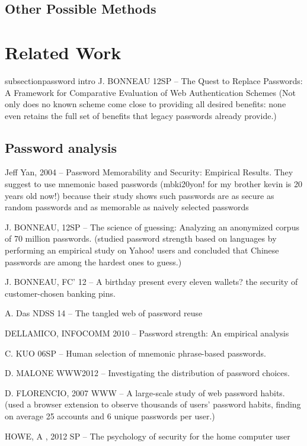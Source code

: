 \documentclass{sig-alternate}
\begin{document}
\subsection{Other Possible Methods}



\section{Related Work}
subsection{password intro}
J. BONNEAU 12SP -- The Quest to Replace Passwords: A Framework for Comparative Evaluation of Web Authentication Schemes (Not only does no known scheme come close to providing all desired benefits: none even retains the full set of benefits that legacy passwords already provide.)



\subsection{Password analysis}
Jeff Yan, 2004 -- Password Memorability and Security: Empirical Results. 
They suggest to use mnemonic based passwords (mbki20yon! for my brother kevin is 20 years old now!) because their study shows such passwords are as secure as random passwords and as memorable as naively selected passwords


J. BONNEAU, 12SP -- The science of guessing: Analyzing an anonymized corpus of 70 million passwords. (studied password strength based on languages by performing an empirical study on Yahoo! users and concluded that Chinese passwords are among the hardest ones to guess.)

J. BONNEAU, FC' 12 -- A birthday present every eleven wallets? the security of customer-chosen banking pins.

A. Das NDSS 14 -- The tangled web of password reuse

DELLAMICO, INFOCOMM 2010 -- Password strength: An empirical analysis

C. KUO 06SP -- Human selection of mnemonic phrase-based passwords.

D. MALONE WWW2012 -- Investigating the distribution of password choices.

D. FLORENCIO, 2007 WWW -- A large-scale study of web password habits. (used a browser extension to observe thousands of users’ password habits, finding on average 25 accounts and 6 unique passwords per user.)

HOWE, A , 2012 SP -- The psychology of security for the home computer user
\end{document}
